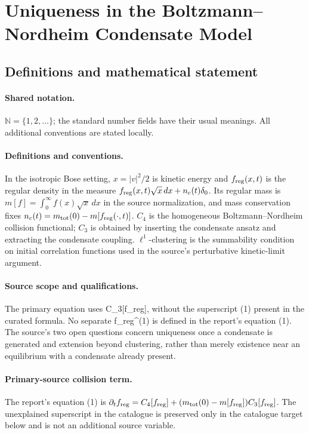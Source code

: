 \documentclass[11pt]{article}
\begin{document}
\section{Uniqueness in the Boltzmann–Nordheim Condensate Model}\label{statement}

\subsection{Definitions and mathematical statement}

\paragraph{Shared notation.}$\mathbb N=\{1,2,\ldots\}$; the standard number fields have their usual meanings. All additional conventions are stated locally.


\paragraph{Definitions and conventions.} In the isotropic Bose setting, $x=|v|^2/2$ is kinetic energy and $f_{\rm reg}(x,t)$ is the regular density in the measure $f_{\rm reg}(x,t)\sqrt{x}\,dx+n_c(t)\delta_0$. Its regular mass is $m[f]=\int_0^\infty f(x)\sqrt{x}\,dx$ in the source normalization, and mass conservation fixes $n_c(t)=m_{\rm tot}(0)-m[f_{\rm reg}(\cdot,t)]$. $C_4$ is the homogeneous Boltzmann--Nordheim collision functional; $C_3$ is obtained by inserting the condensate ansatz and extracting the condensate coupling. $\ell^1$-clustering is the summability condition on initial correlation functions used in the source's perturbative kinetic-limit argument.

\paragraph{Source scope and qualifications.} The primary equation uses C\_3[f\_reg], without the superscript (1) present in the curated formula. No separate f\_reg^(1) is defined in the report's equation (1). The source's two open questions concern uniqueness once a condensate is generated and extension beyond clustering, rather than merely existence near an equilibrium with a condensate already present.

\paragraph{Primary-source collision term.} The report's equation (1) is $\partial_t f_{\rm reg}=C_4[f_{\rm reg}]+(m_{\rm tot}(0)-m[f_{\rm reg}])C_3[f_{\rm reg}]$. The unexplained superscript in the catalogue is preserved only in the catalogue target below and is not an additional source variable.
\end{document}
